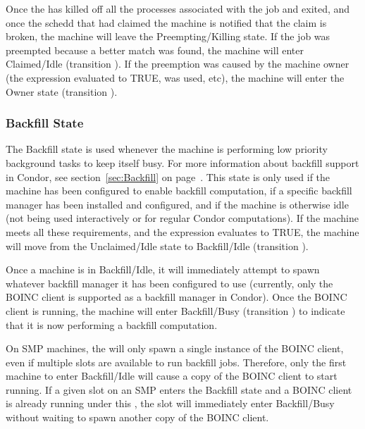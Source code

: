 Once the  has killed off all the processes associated
with the job and exited, and once the schedd that had claimed the
machine is notified that the claim is broken, the machine will leave
the Preempting/Killing state.
If the job was preempted because a better match was found, the machine
will enter Claimed/Idle (transition ).
If the preemption was caused by the machine owner (the 
expression evaluated to TRUE,  was used, etc), the
machine will enter the Owner state (transition ).


\subsubsection{\label{sec:Backfill-State}Backfill State}

The Backfill state is used whenever the machine is performing low
priority background tasks to keep itself busy.
For more information about backfill support in Condor, see
section~\ref{sec:Backfill} on page~\pageref{sec:Backfill}.
This state is only used if the machine has been configured to enable
backfill computation, if a specific backfill manager has been
installed and configured, and if the machine is otherwise idle (not
being used interactively or for regular Condor computations).
If the machine meets all these requirements, and the
 expression evaluates to TRUE, the machine will
move from the Unclaimed/Idle state to Backfill/Idle (transition
).

Once a machine is in Backfill/Idle, it will immediately attempt to
spawn whatever backfill manager it has been configured to use
(currently, only the BOINC client is supported as a backfill manager
in Condor).
Once the BOINC client is running, the machine will enter
Backfill/Busy (transition ) to indicate that it is now
performing a backfill computation.

\Note On SMP machines, the  will only spawn a single
instance of the BOINC client, even if multiple slots are
available to run backfill jobs.
Therefore, only the first machine to enter Backfill/Idle will cause a
copy of the BOINC client to start running.
If a given slot on an SMP enters the Backfill state and a
BOINC client is already running under this , the
slot will immediately enter Backfill/Busy without waiting
to spawn another copy of the BOINC client.

